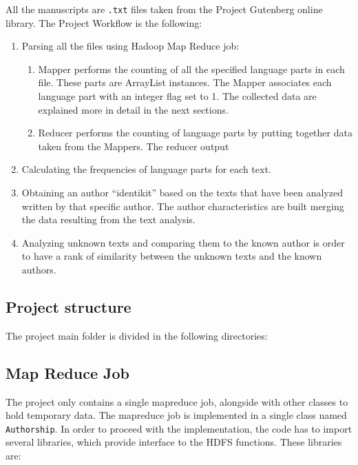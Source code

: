 \documentclass[a4paper,11pt, twoside]{article}
\begin{document}
	All the manuscripts are \texttt{.txt} files taken from the Project Gutenberg\parencite{Gutenberg} online library.
	The Project Workflow is the following:
	\begin{enumerate}
		\item Parsing all the files using Hadoop Map Reduce job: 
		\begin{enumerate}
			\item Mapper performs the counting of all the specified language parts in each file. These parts are ArrayList instances. The Mapper associates each language part with an integer flag set to 1. The collected data are explained more in detail in the next sections. 
			
			\item Reducer performs the counting of language parts by putting together data taken from the Mappers. The reducer output  
		\end{enumerate}
		\item Calculating the frequencies of language parts for each text.
		\item Obtaining an author ``identikit'' based on the texts that have been analyzed written by that specific author. The author characteristics are built merging the data resulting from the text analysis.
		\item Analyzing unknown texts and comparing them to the known author is order to have a rank of similarity between the unknown texts and the known authors.
	\end{enumerate}

	\subsection{Project structure}
	The project main folder is divided in the following directories:
	\begin{figure}[H]
	\end{figure}

	\subsection{Map Reduce Job}
	The project only contains a single mapreduce job, alongside with other classes to hold temporary data. The mapreduce job is implemented in a single class named \lstinline|Authorship|. In order to proceed with the implementation, the code has to import several libraries, which provide interface to the HDFS functions. These libraries are:
	\begin{figure}[H]
	\end{figure}
\end{document}
